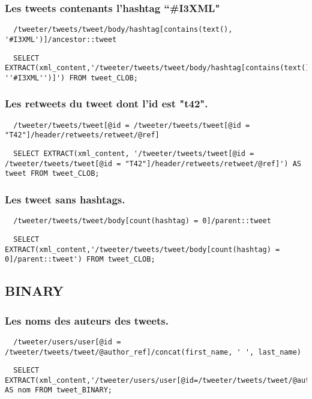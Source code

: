 \subsubsection{Les tweets contenants l’hashtag “\#I3XML"}
\begin{verbatim}
  /tweeter/tweets/tweet/body/hashtag[contains(text(), '#I3XML')]/ancestor::tweet	
\end{verbatim}
\begin{verbatim}
  SELECT EXTRACT(xml_content,'/tweeter/tweets/tweet/body/hashtag[contains(text(), ''#I3XML'')]') FROM tweet_CLOB;
\end{verbatim}

\subsubsection{Les retweets du tweet dont l’id est "t42".}
\begin{verbatim}
  /tweeter/tweets/tweet[@id = /tweeter/tweets/tweet[@id = "T42"]/header/retweets/retweet/@ref]
\end{verbatim}
\begin{verbatim}
  SELECT EXTRACT(xml_content, '/tweeter/tweets/tweet[@id = /tweeter/tweets/tweet[@id = "T42"]/header/retweets/retweet/@ref]') AS tweet FROM tweet_CLOB;
\end{verbatim}

\subsubsection{Les tweet sans hashtags.}
\begin{verbatim}
  /tweeter/tweets/tweet/body[count(hashtag) = 0]/parent::tweet
\end{verbatim}
\begin{verbatim}
  SELECT EXTRACT(xml_content,'/tweeter/tweets/tweet/body[count(hashtag) = 0]/parent::tweet') FROM tweet_CLOB;
\end{verbatim}

\subsection{BINARY}
\subsubsection{Les noms des auteurs des tweets.}
\begin{verbatim}
  /tweeter/users/user[@id = /tweeter/tweets/tweet/@author_ref]/concat(first_name, ' ', last_name)
\end{verbatim}
\begin{verbatim}
  SELECT EXTRACT(xml_content,'/tweeter/users/user[@id=/tweeter/tweets/tweet/@author_ref]/user_name') AS nom FROM tweet_BINARY;
\end{verbatim}

